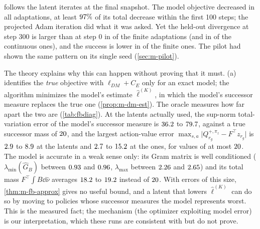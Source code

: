  follows the latent iterates at the final snapshot.
The model objective decreased in all  adaptations, at least $\vn{s11.dmpath.frac}{97}\%$ of its total decrease within the first 100 steps; the projected Adam iteration did what it was asked.
Yet the held-out divergence at step 300 is larger than at step $0$ in  of the  finite adaptations (and in  of the  continuous ones), and the success is lower in  of the  finite ones.
The pilot had shown the same pattern on its single seed (\cref{sec:m-pilot}).

The theory explains why this can happen without proving that it must.
(a) identifies the \emph{true} \DMFB{} objective with $\ell_{DM}+C_E$ only for an exact model; the algorithm minimizes the model's estimate $\hat\ell^{(K)}$, in which the model's successor measure replaces the true one (\cref{prop:m-dm-est}).
The oracle measures how far apart the two are (\cref{tab:fbdiag}).
At the latents actually used, the sup-norm total-variation error of the model's successor measure is $\vn{s11.tv.lo}{36.2}$ to $\vn{s11.tv.hi}{79.7}$, against a true successor mass of $\vn{const.mass}{20}$, and the largest action-value error $\max_{s,a}\lvert Q^{+,\pi_z}_{r_g}-F^\top z_{r_g}\rvert$ is $\vn{s11.q.er.lo}{2.9}$ to $\vn{s11.q.er.hi}{8.9}$ at the \ERFB{} latents and $\vn{s11.q.dm.lo}{2.7}$ to $\vn{s11.q.dm.hi}{15.2}$ at the \DMFB{} ones, for values of at most $\vn{const.mass}{20}$.
The model is accurate in a weak sense only: its Gram matrix is well conditioned ($\lambda_{\min}(\hat G_B)$ between $\vn{s11.lmin.lo}{0.93}$ and $\vn{s11.lmin.hi}{0.96}$, $\lambda_{\max}$ between $\vn{s11.lmax.lo}{2.26}$ and $\vn{s11.lmax.hi}{2.65}$) and its total mass $F^\top\int B\dd\hat\nu$ averages $\vn{s11.mass.lo}{18.2}$ to $\vn{s11.mass.hi}{19.2}$ instead of $\vn{const.mass}{20}$.
With errors of this size, \cref{thm:m-fb-approx} gives no useful bound, and a latent that lowers $\hat\ell^{(K)}$ can do so by moving to policies whose successor measures the model represents worst.
This is the measured fact; the mechanism (the optimizer exploiting model error) is our interpretation, which these runs are consistent with but do not prove.

\begin{table}[ht]
\centering\small
\caption{FB diagnostics at the final pretraining snapshot (evaluation only). $\hat G_B$ is the uncentred Gram matrix of $B$ under the replay measure; $\overline{F^\top\!\int B\dd\hat\nu}$ the model's mean total successor mass (exact value $\vn{const.mass}{20}$); $\lVert z_{ER}\rVert$ the norm before projection to radius $4$; the entropy is the mean policy entropy of the \ERFB{} and \DMFB{} policies at the \DMFB{} start states; the last two columns are the exact FB-6 errors of \cref{thm:m-fb-approx} at the \ERFB{} and \DMFB{} latents (finite mazes only). Ranges are over the three goals that share a model.}\label{tab:fbdiag}
\resizebox{\textwidth}{!}{}
\end{table}


